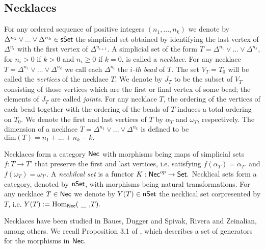 
\subsection{Necklaces} For any ordered sequence of positive integers $(n_1,...,n_k)$ we denote by $\Delta^{n_1} \vee...\vee \Delta^{n_k} \in \mathsf{sSet}$ the simplicial set obtained by identifying the last vertex of $\Delta^{n_i}$ with the first vertex of $\Delta^{n_{i+1}}.$ A simplicial set of the form $T=\Delta^{n_1} \vee...\vee \Delta^{n_k}$, for $n_i>0$ if $k>0$ and $n_i \geq 0$ if $k=0$, is called a \textit{necklace}. For any necklace $T= \Delta^{n_1} \vee...\vee \Delta^{n_k}$ we call each $\Delta^{n_i}$ the \textit{$i$-th bead} of $T$. The set $V_T=T_0$ will be called the \textit{vertices} of the necklace $T$. We denote by $J_T$ to be the subset of $V_T$ consisting of those vertices which are the first or final vertex of some bead; the elements of $J_T$ are called \textit{joints}. For any necklace $T$, the ordering of the vertices of each bead together with the ordering of the beads of $T$ induces a total ordering on $T_0.$ We denote the first and last vertices of $T$ by $\alpha_T$ and $\omega_T$, respectively. The dimension of a necklace $T=\Delta^{n_1} \vee...\vee \Delta^{n_k}$ is defined to be $\text{dim}(T)=n_1 + ... +n_k-k.$

Necklaces form a category $\mathsf{Nec}$ with morphisms being maps of simplicial sets $f: T \to T'$ that preserve the first and last vertices, i.e. satisfying $f(\alpha_T)=\alpha_{T'}$ and $f(\omega_T)=\omega_{T'}.$ A \textit{neckilcal set} is a functor $K: \mathsf{Nec}^{op} \to \mathsf{Set}.$ Necklical sets form a category, denoted by $\mathsf{nSet}$, with morphisms being natural transformations. For any necklace $T \in \mathsf{Nec}$ we denote by $Y(T)\in \mathsf{nSet}$ the necklical set corpresented by $T$, i.e. $Y(T):=\mathrm{Hom}_{\mathsf{Nec}}( \text{ \_ ,} T).$


Necklaces have been studied in Baues, Dugger and Spivak, Rivera and Zeinalian,  among others. We recall Proposition 3.1 of \cite{Rivera and Zeinalian, cubical rigidification}, which describes a set of generators for the morphisms in $\mathsf{Nec}.$

